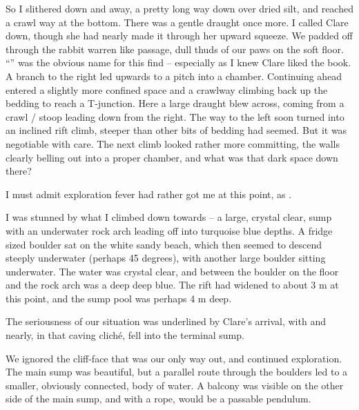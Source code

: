 So I slithered down and away, a pretty long way down over dried silt,
and reached a crawl way at the bottom. There was a gentle draught once
more. I called Clare down, though she had nearly made it through her
upward squeeze. We padded off through the rabbit warren like passage,
dull thuds of our paws on the soft floor. ``'' was
the obvious name for this find -- especially as I knew Clare liked the
book. A branch to the right led upwards to a pitch into a chamber.
Continuing ahead entered a slightly more confined space and a crawlway
climbing back up the bedding to reach a T-junction. Here a large draught
blew across, coming from a crawl / stoop leading down from the right.
The way to the left soon turned into an inclined rift climb, steeper
than other bits of bedding had seemed. But it was negotiable with
care. The next climb looked rather more committing, the walls clearly
belling out into a proper chamber, and what was that dark space down
there?

I must admit exploration fever had rather got me at this point, as . 

I was
stunned by what I climbed down towards -- a large, crystal clear, sump
with an underwater rock arch leading off into turquoise blue depths. 
A fridge sized boulder sat on the white sandy beach, which then seemed to descend steeply underwater (perhaps 45 degrees), with another large boulder sitting underwater. 
The water was crystal clear, and between the boulder on the floor and the rock arch was a deep deep blue. 
The rift had widened to about 3 m at this point, and the sump pool was perhaps 4 m deep. 

The
seriousness of our situation was underlined by Clare's arrival, with  and nearly,
in that caving cliché, fell into the terminal sump.

We ignored the cliff-face that was our only way out, and continued
exploration. The main sump was beautiful, but a parallel route through
the boulders led to a smaller, obviously connected, body of water. A balcony was visible on the other side of the main sump, and with a rope,
would be a passable pendulum. 



